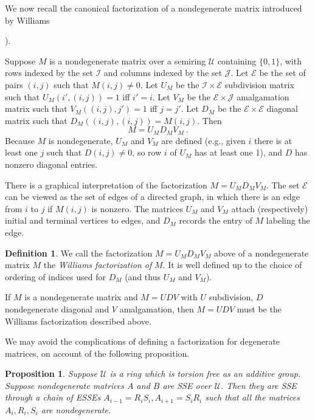 \documentclass{amsart}
\newtheorem{proposition}[theorem]{Proposition}
\theoremstyle{definition}
\newtheorem{definition}[theorem]{Definition}
\theoremstyle{remark}
\numberwithin{equation}{section}
\begin{document}
We now recall the canonical factorization of a nondegenerate matrix 
introduced by Williams {\cite{Wi}). 

Suppose $M$ is a nondegenerate matrix over a semiring $\mathcal U$ 
containing $\{0,1\}$, 
with rows indexed by the set $\mathcal I$ and columns indexed by the 
set $\mathcal J$. 
Let $\mathcal E$ be the set of pairs $(i,j)$ such that $M(i,j)\neq 0$.  
Let $U_M$ be the $\mathcal I \times \mathcal E$
subdivision matrix such that $U_M(i',(i,j))=1$ iff $i'=i$. 
Let $V_M$ be the $\mathcal E \times \mathcal J$ amalgamation matrix such that 
$V_M((i,j),j')=1$ iff $j=j'$. Let $D_M$ be the $\mathcal E \times \mathcal E$ 
diagonal matrix such that $D_M((i,j),(i,j))= M(i,j)$. 
Then 
\[
M = U_MD_MV_M \ .
\] 
Because $M$ is nondegenerate, $U_M$ and $V_M$ are defined (e.g., given $i$
there is at least one $j$ such that $D(i,j)\neq 0$, so row $i$ of $U_M$ has 
at least one 1), and $D$ has nonzero diagonal entries.   

There is a graphical interpretation of the factorization 
$M = U_MD_MV_M $. The set $\mathcal E$ can be viewed as the set of 
edges of a directed graph, in which there is an edge from $i$ to $j$
if $M(i,j)$ is nonzero. The matrices $U_M$ and $V_M$ attach (respectively)
initial and terminal vertices to edges, and $D_M$ records the entry of 
$M$ labeling the edge. 

\begin{definition}
We call the factorization $M = U_MD_MV_M$ above 
of a nondegenerate matrix $M$  
the {\it Williams factorization of } $M$. It is well defined up to 
the choice of ordering of indices used for $D_M$ (and thus $U_M$ and 
$V_M$). 
\end{definition} 
If $M$ is a nondegenerate matrix and $M=UDV$ with 
$U$ subdivision, $D$ nondegenerate diagonal and $V$ amalgamation, 
then $M=UDV$ must be the Williams factorization described above. 

We may avoid the complications of defining a  factorization 
for degenerate matrices, on account of the following proposition. 

\begin{proposition} \label{nondegeneratesseprop} 
Suppose ${\mathcal U}$ is a ring which is torsion free as an additive group. 
Suppose nondegenerate matrices $A$ and $B$ are SSE over ${\mathcal U}$. 
Then they are SSE through a chain of ESSEs 
$A_{i-1} =R_iS_i, A_{i+1}=S_iR_i$ such that all the matrices 
$A_i, R_i,S_i $ are nondegenerate. 
\end{proposition} 

}
\end{document}
